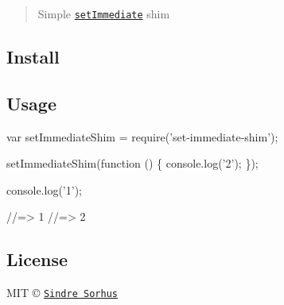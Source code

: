 \begin{quote}
Simple \href{https://developer.mozilla.org/en-US/docs/Web/API/Window.setImmediate}{\tt {\ttfamily set\+Immediate}} shim \end{quote}


\subsection*{Install}




\subsection*{Usage}


\begin{DoxyCode}
var setImmediateShim = require('set-immediate-shim');

setImmediateShim(function () \{
    console.log('2');
\});

console.log('1');

//=> 1
//=> 2
\end{DoxyCode}


\subsection*{License}

M\+IT © \href{http://sindresorhus.com}{\tt Sindre Sorhus} 
